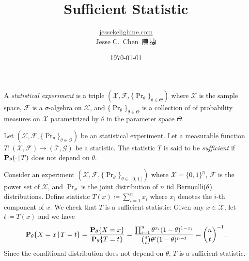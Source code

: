 \documentclass[a4paper]{article}
\title{Sufficient Statistic}
\author{\href{https://jessekelighine.com}{jessekelighine.com}\\Jesse C.\ Chen\ 陳\,捷}
\date{\today}
\begin{document}
\maketitle

\begin{definition}
	A \emph{statistical experiment} is a triple $(\mathcal{X},\mathcal{F},\{\Pr_{\theta}\}_{\theta\in\Theta})$ where
	$\mathcal{X}$ is the sample space,
	$\mathcal{F}$ is a $\sigma$-algebra on $\mathcal{X}$, and
	$\{\Pr_{\theta}\}_{\theta\in\Theta}$ is a collection of of probability measures
	on $\mathcal{X}$ parametrized by $\theta$ in the parameter space $\Theta$.
\end{definition}

\begin{definition}
	Let $(\mathcal{X},\mathcal{F},\{\Pr_{\theta}\}_{\theta\in\Theta})$ be an statistical experiment.
	Let a measurable function $T:(\mathcal{X},\mathcal{F})\to(\mathcal{T},\mathcal{G})$ be a statistic.
	The statistic $T$ is said to be \emph{sufficient} if $\Pr_{\theta}(\cdot\given T)$ does not depend on $\theta$.
\end{definition}

\begin{example}\label{eg:bernoulli}
	Consider an experiment $(\mathcal{X},\mathcal{F},\{\Pr_{\theta}\}_{\theta\in[0,1]})$
	where $\mathcal{X}=\{0,1\}^{n}$,
	$\mathcal{F}$ is the power set of $\mathcal{X}$,
	and $\Pr_{\theta}$ is the joint distribution of $n$ iid $\bernoulli(\theta)$ distributions.
	Define statistic $T(x)\coloneqq\sum_{i=1}^{n}x_i$ where $x_i$ denotes the $i$-th component of $x$.
	We check that $T$ is a sufficient statistic:
	Given any $x\in\mathcal{X}$, let $t\coloneqq T(x)$ and we have
	\begin{align*}
		\pr[\theta]{X=x\given T=t}
		= \frac{ \pr[\theta]{X=x} }{ \pr[\theta]{T=t} }
		= \frac{ \prod_{i=1}^{n} \theta^{x_i} (1-\theta)^{1-x_i} } { {n\choose t}\theta^{t}(1-\theta)^{n-t} }
		= {n\choose t}\inv.
	\end{align*}
	Since the conditional distribution does not depend on $\theta$, $T$ is a sufficient statistic.
\end{example}
\end{document}
